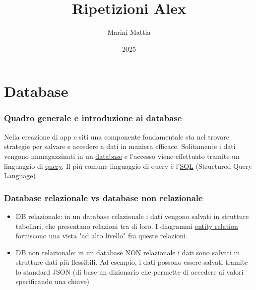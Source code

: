 

\title{Ripetizioni Alex}
\author{Marini Mattia}
\date{2025}
\lstset{
frame = none
  }


\maketitle
{}
\tableofcontents

\listofexercises

\newpage

\section{Database}
\subsubsection*{Quadro generale e introduzione ai database}
Nella creazione di app e siti una componente fondamentale sta nel trovare strategie per salvare e accedere a dati in maniera efficace. Solitamente i dati vengono immagazzinati in un \underline{database} e l'accesso viene effettuato tramite un linguaggio di \underline{query}. Il più comune linguaggio di query è l'\underline{SQL} (Structured Query Language).
\vskip3mm
\subsubsection*{Database relazionale vs database non relazionale}
\begin{itemize}
	\item DB relazionale:
	      in un database relazionale i dati vengono salvati in strutture tabellari, che presentano relazioni tra di loro. I diagrammi \underline{entity relation} forniscono una vista "ad alto livello" fra queste relazioni.
	\item DB non relazionale:
	      in un database NON relazionale i dati sono salvati in strutture dati più flessibili. Ad esempio, i dati possono essere salvati tramite lo standard JSON (di base un dizionario che permette di accedere ai valori specificando una chiave)
\end{itemize}


